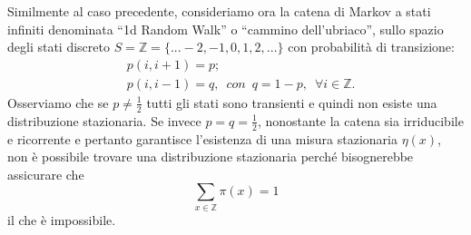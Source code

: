 \documentclass[12pt]{homework}
\begin{document}
\begin{enumerate}
Similmente al caso precedente, consideriamo ora  la catena di Markov a stati infiniti denominata ``1d Random Walk'' o ``cammino dell'ubriaco'', sullo spazio degli stati discreto $S=\mathbb{Z}=\{...-2,-1,0,1,2,...\}$ con probabilità di transizione: 
\begin{align*}
&p\left(i,i+1\right)=p;\\
&p\left(i,i-1\right)=q, \,\,\, con \,\,\, q = 1-p, \,\,\, \forall i\in \mathbb{Z}.
\end{align*}
Osserviamo che se $p \neq \frac{1}{2}$ tutti gli stati sono transienti e quindi non esiste una distribuzione stazionaria.
Se invece $p = q = \frac{1}{2}$, nonostante la catena sia irriducibile e ricorrente e pertanto garantisce l'esistenza di una misura stazionaria $\eta(x)$, non è possibile trovare una distribuzione stazionaria perché bisognerebbe assicurare che 
\[\sum_{x \in \mathbb{Z}} \pi(x) = 1\] 
il che è impossibile. 
 
\end{enumerate}

  \newpage
\section{}%
\end{document}
